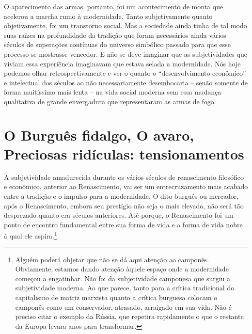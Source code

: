 O aparecimento das armas, portanto, foi um acontecimento de monta que acelerou a marcha
rumo à modernidade. Tanto subjetivamente quanto objetivamente, foi um
transtorno social. Mas a sociedade ainda tinha de tal modo suas raízes
na profundidade da tradição que foram necessários ainda vários séculos
de superações contínuas do universo simbólico passado para que esse
processo se mostrasse vencedor. E não se deve imaginar que as
subjetividades que viviam essa experiência imaginavam que estava selada
a modernidade. Nós hoje podemos olhar retrospectivamente e ver o quanto
o ``desenvolvimento econômico'' e intelectual dos séculos  ao  não
necessariamente desembocaria -- senão somente de forma muitíssimo mais lenta
-- na vida social moderna sem essa mudança qualitativa de grande
envergadura que representaram as armas de fogo.

\section{O Burguês fidalgo, O avaro, Preciosas ridículas: tensionamentos}

A subjetividade amadurecida durante os vários séculos de
renascimento filosófico e econômico, anterior ao
Renascimento, vai ser um entrecruzamento mais acabado entre a tradição e
o impulso para a modernidade. O dito burguês ou mercador, após o
Renascimento, embora seu prestígio não seja o mais elevado, não será tão
desprezado quanto era séculos anteriores. Até porque, o Renascimento foi
um ponto de encontro fundamental entre sua forma de vida e a forma de
vida nobre à qual ele aspira.\footnote{Alguém poderá objetar que não se
  dá aqui atenção ao camponês. Obviamente, estamos dando atenção àquele
  espaço onde a modernidade começou a engatinhar. Não foi da
  subjetividade camponesa que surgiu a subjetividade moderna. Ao que
  parece, tanto para a crítica tradicional do capitalismo de matriz
  marxista quanto a crítica burguesa colocam o camponês como um
  conservador, atrasado, arraigado em sua vida. Não é preciso citar o
  exemplo da Rússia, que repetira rapidamente o que o restante da Europa
  levara anos para transformar.}

